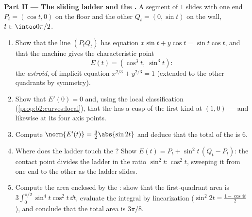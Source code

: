 \begin{problem}
\medskip
\noindent\textbf{Part II --- The sliding ladder and the
.} A segment of  $1$ slides with one end $P_t =
(\cos t, 0)$ on the floor and the other $Q_t = (0, \sin t)$ on
the wall, $t \in \intoo0{\pi/2}$.
\begin{enumerate}[resume]
  \item Show that the line $(P_tQ_t)$ has equation $x\sin t +
        y\cos t = \sin t\cos t$, and that the  machine
        gives the characteristic point
        \[
        E(t) = (\cos^3 t,\ \sin^3 t) :
        \]
        the \emph{astroid}, of implicit
        equation $x^{2/3} + y^{2/3} = 1$ (extended to the
        other quadrants by symmetry).
  \item Show that $E'(0) = 0$ and, using the local
        classification (\cref{prop:b2:curves:local}), that
        the  has a cusp of the first kind at $(1, 0)$
        --- and likewise at its four axis points.
  \item Compute $\norm{E'(t)} = \tfrac32\abs{\sin 2t}$ and
        deduce that the total  of the  is $6$.
  \item Where does the ladder touch the ? Show $E(t) =
        P_t + \sin^2 t\,(Q_t - P_t)$: the contact point
        divides the ladder in the ratio $\sin^2 t : \cos^2
        t$, sweeping it from one end to the other as the
        ladder slides.
  \item Compute the area enclosed by the : show that
        the first-quadrant area is $3\int_0^{\pi/2}\sin^4
        t\cos^2 t\,\dd t$, evaluate the integral by
        linearization ($\sin^2 2t = \tfrac{1 - \cos 4t}2$),
        and conclude that the total area is $3\pi/8$.
\end{enumerate}


\end{problem}
